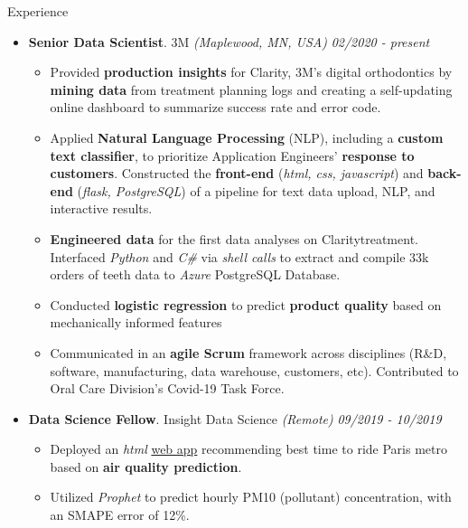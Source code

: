\documentclass{resume} %
\begin{document}
	
	\begin{rSection}{Experience}
		
		\begin{itemize}[leftmargin=0em]
			
			\item {\bf Senior Data Scientist}{. 3M \textit{(Maplewood, MN, USA)}} \hfill {\em 02/2020 - present}\\
			\vspace{-5mm}
			\begin{itemize}
				\setlength\itemsep{-1.75em}			
				\item Provided \textbf{production insights} for Clarity\texttrademark, 3M's digital orthodontics  by \textbf{mining data} from treatment planning logs and creating a self-updating online dashboard to summarize success rate and error code.\\
				\item Applied \textbf{Natural Language Processing} (NLP), including a \textbf{custom text classifier}, to prioritize Application Engineers' \textbf{response to customers}. Constructed the \textbf{front-end} (\textit{html, css, javascript}) and \textbf{back-end} (\textit{flask, PostgreSQL}) of a pipeline for text data upload, NLP, and interactive results.\\
				\item \textbf{Engineered data} for the first data analyses on Clarity\texttrademark treatment. Interfaced \textit{Python} and \textit{C\#} via \textit{shell calls} to extract and compile 33k orders of teeth data to \textit{Azure} PostgreSQL Database.\\
				\item Conducted \textbf{logistic regression} to predict \textbf{product quality} based on mechanically informed features\\
				\item Communicated in an \textbf{agile Scrum} framework across disciplines (R\&D, software, manufacturing, data warehouse, customers, etc). Contributed to Oral Care Division's Covid-19 Task Force.
			\end{itemize}	
		
			\item {\bf Data Science Fellow}{. Insight Data Science \textit{(Remote)}} \hfill {\em 09/2019 - 10/2019}\\
			\vspace{-5mm}
			\begin{itemize}
				\setlength\itemsep{-1.75em}
				\item Deployed an \textit{html} \href{https://aety.github.io/my-first-web-app}{web app} recommending best time to ride Paris metro based on \textbf{air quality prediction}.\\
				\item Utilized \textit{Prophet} to predict hourly PM10 (pollutant) concentration, with an SMAPE error of 12\%.
			\end{itemize}	
			

\end{itemize}
\end{rSection}
\end{document}
